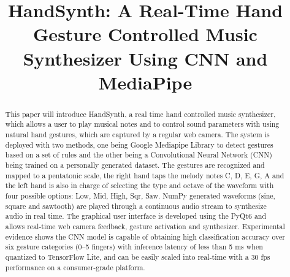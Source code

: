 \documentclass[conference]{IEEEtran}
\begin{document}
\title{HandSynth: A Real-Time Hand Gesture Controlled Music Synthesizer Using CNN and MediaPipe}

\author{
\and
{}
\and
{}
\and
{}
}

\maketitle

\begin{abstract}
This paper will introduce HandSynth, a real time hand controlled music synthesizer, which allows a user to play musical notes and to control sound parameters with using natural hand gestures, which are captured by a regular web camera. The system is deployed with two methods, one being Google Mediapipe Library to detect gestures based on a set of rules and the other being a Convolutional Neural Network (CNN) being trained on a personally generated dataset. The gestures are recognized and mapped to a pentatonic scale, the right hand taps the melody notes C, D, E, G, A and the left hand is also in charge of selecting the type and octave of the waveform with four possible options: Low, Mid, High, Sqr, Saw. NumPy generated waveforms (sine, square and sawtooth) are played through a continuous audio stream to synthesize audio in real time. The graphical user interface is developed using the PyQt6 and allows real-time web camera feedback, gesture activation and synthesizer. Experimental evidence shows the CNN model is capable of obtaining high classification accuracy over six gesture categories (0--5 fingers) with inference latency of less than 5 ms when quantized to TensorFlow Lite, and can be easily scaled into real-time with a 30 fps performance on a consumer-grade platform.
\end{abstract}
\end{document}

